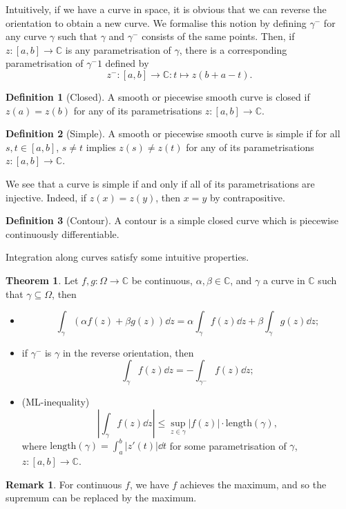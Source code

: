 \documentclass[
]{article}
\theoremstyle{definition}
\newtheorem{theorem}{Theorem}
\newtheorem*{remark}{Remark}
\theoremstyle{definition}
\newtheorem{definition}{Definition}[section]
\begin{document}
Intuitively, if we have a curve in space, it is obvious that we can
reverse the orientation to obtain a new curve. We formalise this notion
by defining \(\gamma^-\) for any curve \(\gamma\) such that \(\gamma\)
and \(\gamma^-\) consists of the same points. Then, if
\(z : [a, b] \to \mathbb{C}\) is any parametrisation of \(\gamma\),
there is a corresponding parametrisation of \(\gamma^-1\) defined by
\[z^- : [a, b] \to \mathbb{C} : t \mapsto z(b + a - t).\]

\begin{definition}[Closed]
  A smooth or piecewise smooth curve is closed if \(z(a) = z(b)\) for any of 
  its parametrisations \(z : [a, b] \to \mathbb{C}\).
\end{definition}
\begin{definition}[Simple]
  A smooth or piecewise smooth curve is simple if for all \(s, t \in [a, b]\), 
  \(s \neq t\) implies \(z(s) \neq z(t)\) for any of its parametrisations 
  \(z : [a, b] \to \mathbb{C}\).
\end{definition}

We see that a curve is simple if and only if all of its parametrisations
are injective. Indeed, if \(z(x) = z(y)\), then \(x = y\) by
contrapositive.

\begin{definition}[Contour]
  A contour is a simple closed curve which is piecewise continuously differentiable.
\end{definition}

Integration along curves satisfy some intuitive properties.

\begin{theorem}
  Let \(f, g : \Omega \to \mathbb{C}\) be continuous, \(\alpha, \beta \in \mathbb{C}\), 
  and \(\gamma\) a curve in \(\mathbb{C}\) such that \(\gamma \subseteq \Omega\), then 
  \begin{itemize}
    \item \[\int_\gamma (\alpha f(z) + \beta g(z)) \dd z 
      = \alpha \int_\gamma f(z) \dd z + \beta \int_\gamma g(z) \dd z;\]
    \item if \(\gamma^{-}\) is \(\gamma\) in the reverse orientation, then 
      \[\int_\gamma f(z) \dd z = - \int_{\gamma^-} f(z) \dd z;\]
    \item (ML-inequality)
      \[\left| \int_\gamma f(z) \dd z \right| \le 
        \sup_{z \in \gamma}|f(z)| \cdot \text{length}(\gamma),\]
      where \(\text{length}(\gamma) = \int_a^b |z'(t)| \dd t\) for some parametrisation 
      of \(\gamma\), \(z : [a, b] \to \mathbb{C}\).
  \end{itemize}
\end{theorem}
\begin{remark}
  For continuous \(f\), we have \(f\) achieves the maximum, and so the supremum 
  can be replaced by the maximum.
\end{remark}
\proof
\end{document}
